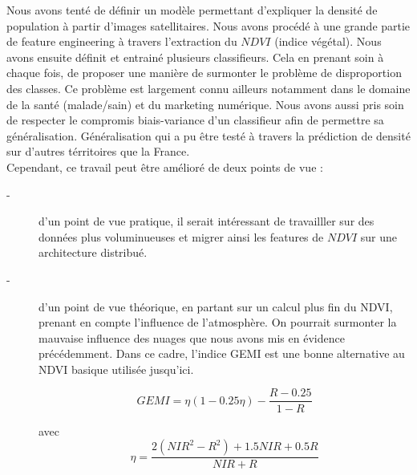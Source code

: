 \documentclass{book}
\begin{document}
Nous avons tenté de définir un modèle permettant d'expliquer la densité de population à partir d'images
satellitaires. Nous avons procédé à une grande partie de \og feature engineering \fg{} à travers l'extraction 
du $NDVI$ (indice végétal). Nous avons ensuite définit et entrainé plusieurs classifieurs. Cela en prenant soin à chaque
fois, de proposer une manière de surmonter le problème de disproportion des classes. Ce problème est largement connu ailleurs
notamment dans le domaine de la santé (malade/sain) et du marketing numérique. Nous avons aussi pris soin de respecter le compromis biais-variance
d'un classifieur afin de permettre sa généralisation. Généralisation qui a pu être testé à travers la 
prédiction de densité sur d'autres térritoires que la France.\\
Cependant, ce travail peut être amélioré de deux points de vue : 
\begin{description}
\item[-] d'un point de vue pratique, il serait intéressant de travailller sur des données plus voluminueuses et migrer 
ainsi les features de $NDVI$ sur une architecture distribué.
\item[-] d'un point de vue théorique, en partant sur un calcul plus fin du NDVI, prenant en compte l'influence de 
l'atmosphère. On pourrait surmonter la mauvaise influence des nuages que nous avons mis en évidence précédemment. Dans ce cadre, 
l'indice GEMI \cite{gemi} est une bonne alternative au NDVI basique utilisée jusqu'ici.

\[GEMI=\eta(1-0.25\eta)-\frac{R-0.25}{1-R}\]

avec \[\eta=\frac{2(NIR^2-R^2)+1.5NIR+0.5R}{NIR+R}\]

\end{description}

\backmatter

\listoftables

\listoffigures



\end{document}
